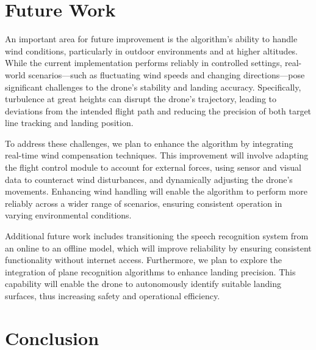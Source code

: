 \documentclass[3p,times]{elsarticle}
\begin{document}
\newpage \section{Future Work} \label{sec:future}
An important area for future improvement is the algorithm's ability to handle wind conditions, particularly in outdoor environments and at higher altitudes. While the current implementation performs reliably in controlled settings, real-world scenarios—such as fluctuating wind speeds and changing directions—pose significant challenges to the drone's stability and landing accuracy. Specifically, turbulence at great heights can disrupt the drone's trajectory, leading to deviations from the intended flight path and reducing the precision of both target line tracking and landing position.

To address these challenges, we plan to enhance the algorithm by integrating real-time wind compensation techniques. This improvement will involve adapting the flight control module to account for external forces, using sensor and visual data to counteract wind disturbances, and dynamically adjusting the drone's movements. Enhancing wind handling will enable the algorithm to perform more reliably across a wider range of scenarios, ensuring consistent operation in varying environmental conditions.

Additional future work includes transitioning the speech recognition system from an online to an offline model, which will improve reliability by ensuring consistent functionality without internet access. Furthermore, we plan to explore the integration of plane recognition algorithms to enhance landing precision. This capability will enable the drone to autonomously identify suitable landing surfaces, thus increasing safety and operational efficiency.

\section{Conclusion}


% 


\end{document}
